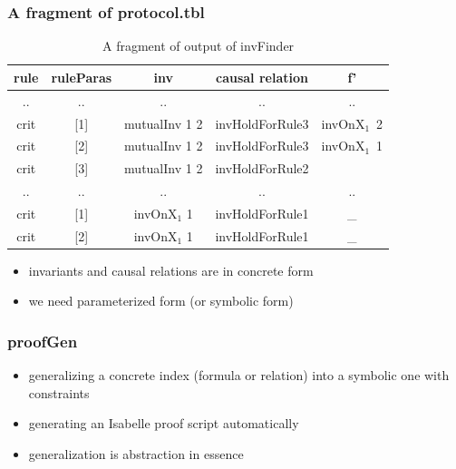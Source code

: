 \documentclass{beamer}
\begin{document}
\begin{frame}\frametitle{A fragment of protocol.tbl}
 \begin{table}[!t]
\centering \caption{A fragment of output of {\sf invFinder}}\label{label-ground-causal relation} %
\begin{tabular}{|c|c|c|c|c|  }
\hline
  rule& ruleParas&inv&causal relation &   f'  \\
\hline
  .. & ..&.. &..&.. \\

\hline
  crit  & [1]&mutualInv 1 2& invHoldForRule3 &invOnX$_1$~2 \\
\hline
  crit &[2]& mutualInv 1 2& invHoldForRule3 &invOnX$_1$~1  \\
\hline
  crit & [3]& mutualInv 1 2 & invHoldForRule2  & \\
\hline
  .. & ..&.. &..&.. \\

\hline
  crit  & [1]&invOnX$_1$ 1 & invHoldForRule1 &\_ \\
\hline
  crit &[2]& invOnX$_1$ 1 & invHoldForRule1 &\_  \\
\hline
\end{tabular}
\end{table}
\begin{itemize}
\item invariants and causal relations are in concrete form
\item we need parameterized form (or symbolic form)



\end{itemize}
\end{frame}


\begin{frame}\frametitle{ {\sf proofGen}}


\begin{itemize}
\item  generalizing a concrete index (formula or relation) into 
a symbolic one with constraints

\item generating an Isabelle proof script automatically 


\item generalization is abstraction in essence
\end{itemize}
 \end{frame}
 
\end{document}
